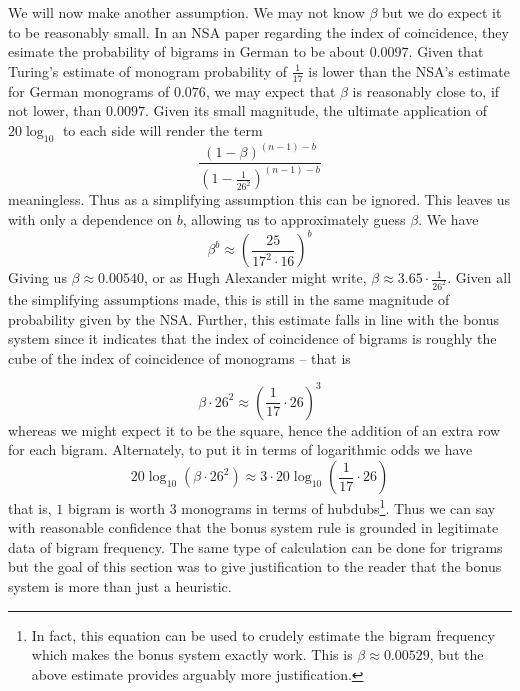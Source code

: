 
\noindent We will now make another assumption. We may not know
$\beta$ but we do expect it to be reasonably small. In an NSA paper
regarding the index of coincidence, they esimate the probability of
bigrams in German to be about $0.0097$. Given that Turing's
estimate of monogram probability of $\frac{1}{17}$ is lower than
the NSA's estimate for German monograms of $0.076$, we may expect
that $\beta$ is reasonably close to, if not lower, than $0.0097$.
Given its small magnitude, the ultimate application of
$20\log_{10}$ to each side will render the term
\[
	\frac{(1-\beta)^{(n-1)-b}}{(1-\frac{1}{26^2})^{(n-1)-b}}
\]
meaningless. Thus as a simplifying assumption this can be ignored.
This leaves us with only a dependence on $b$, allowing us to
approximately guess $\beta$. We have
\[
	\beta^b \approx
	(\frac{25}{17^2\cdot16})^b
\]
Giving us $\beta \approx 0.00540$, or as Hugh Alexander might
write, $\beta \approx 3.65\cdot\frac{1}{26^2}$. Given all the
simplifying assumptions made, this is still in the same magnitude
of probability given by the NSA. Further, this estimate falls in
line with the bonus system since it indicates that the index of
coincidence of bigrams is roughly the cube of the index of
coincidence of monograms -- that is

\[
	\beta\cdot26^2 \approx (\frac{1}{17}\cdot26)^3
\]
whereas we might expect it to be the square, hence the addition of
an extra row for each bigram. Alternately, to put it in terms of
logarithmic odds we have
\[
	20\log_{10}(\beta\cdot26^2) \approx 3\cdot20\log_{10}(\frac{1}{17}\cdot26)
\]
that is, $1$ bigram is worth $3$ monograms in terms of
hubdubs\footnote{In fact, this equation can be used to crudely
	estimate the bigram frequency which makes the bonus system exactly
	work. This is $\beta\approx0.00529$, but the above estimate
	provides arguably more justification.}. Thus we can say with reasonable
confidence that the bonus system rule is grounded in legitimate
data of bigram frequency. The same type of calculation can be done
for trigrams but the goal of this section was to give justification
to the reader that the bonus system is more than just a heuristic.

